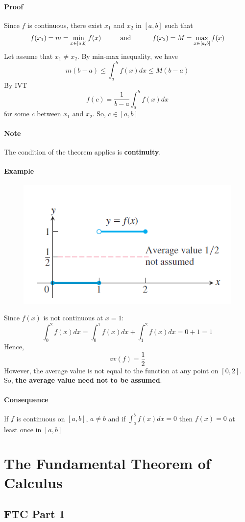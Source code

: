 \documentclass[12pt]{article}
\newcommand\tab[1][1cm]{\hspace*{#1}}
\begin{document}
\paragraph{Proof}
Since $f$ is continuous, there exist $x_1$ and $x_2$ in $[a, b]$ such that 
\[
    f(x_1) = m = \min_{x \in [a, b]} f(x) \textrm{\tab and \tab} f(x_2) = M = \max_{x \in [a, b]} f(x)
\]
Let assume that $x_1 \neq x_2$. By min-max inequality, we have
\[
    m(b - a) \leq \int_a^b f(x) dx \leq M(b - a)
\]
By IVT
\[
    f(c) = \frac{1}{b - a} \int_a^b f(x) dx 
\]
for some $c$ between $x_1$ and $x_2$. So, $c \in [a, b]$

\paragraph{Note} The condition of the theorem applies is \textbf{continuity}.
\paragraph{Example}
\begin{figure}[H]
    \centering
    \includegraphics[width = 0.4\linewidth]{Images/mvt discontinuous.png}
\end{figure}

Since $f(x)$ is not continuous at $x = 1$:
\[
    \int_0^2 f(x) dx = \int_0^1 f(x) dx + \int_1^2 f(x) dx = 0 + 1 = 1
\]
Hence, 
\[
    av(f) = \frac{1}{2}
\]
However, the average value is not equal to the function at any point on $[0, 2]$. So, \textbf{the average value need not to be assumed}.

\paragraph{Consequence} If $f$ is continuous on $[a, b]$, $a \neq b$ and if $\int_a^b f(x) dx = 0$ then $f(x) = 0$ at least once in $[a, b]$

\section{The Fundamental Theorem of Calculus}
\subsection{FTC Part 1}
\end{document}
